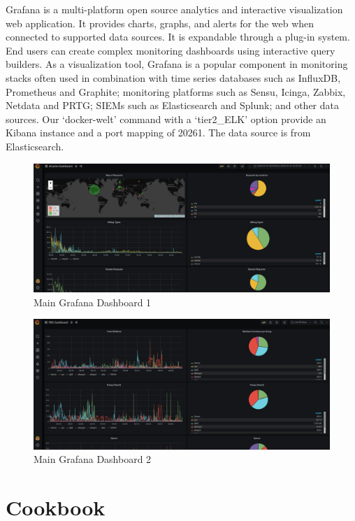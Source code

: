 \documentclass[]{article}
\begin{document}
Grafana is a multi-platform open source analytics and interactive
visualization web application. It provides charts, graphs, and alerts
for the web when connected to supported data sources. It is expandable
through a plug-in system. End users can create complex monitoring
dashboards using interactive query builders. As a visualization tool,
Grafana is a popular component in monitoring stacks often used in
combination with time series databases such as InfluxDB, Prometheus and
Graphite; monitoring platforms such as Sensu, Icinga, Zabbix, Netdata
and PRTG; SIEMs such as Elasticsearch and Splunk; and other data
sources. Our `docker-welt' command with a `tier2\_ELK' option provide an
Kibana instance and a port mapping of 20261. The data source is from
Elasticsearch.

\begin{figure}[htbp]
\centering
\includegraphics{images/grafana1.png}
\caption{Main Grafana Dashboard 1}
\end{figure}

\begin{figure}[htbp]
\centering
\includegraphics{images/grafana2.png}
\caption{Main Grafana Dashboard 2}
\end{figure}

\section{Cookbook}\label{cookbook}
\end{document}
